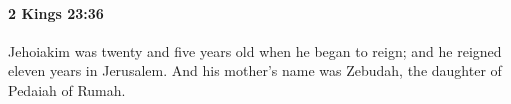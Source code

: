 
		\paragraph{2 Kings 23:36} %
			\label{2KINGS-23-36}

			Jehoiakim was twenty and five years old when he began to reign; and he reigned eleven years in Jerusalem. And his mother’s name was Zebudah, the daughter of Pedaiah of Rumah.


